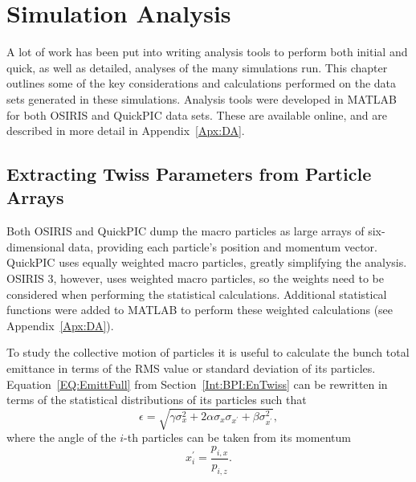 %
%

\chapter{Simulation Analysis}
\label{Ch:SimA}

A lot of work has been put into writing analysis tools to perform both initial and quick, as well as detailed, analyses of the many simulations run.
This chapter outlines some of the key considerations and calculations performed on the data sets generated in these simulations.
Analysis tools were developed in MATLAB for both OSIRIS and QuickPIC data sets.
These are available online, and are described in more detail in Appendix~\ref{Apx:DA}.

\section{Extracting Twiss Parameters from Particle Arrays}
\label{SimA:EnTwiss}

Both OSIRIS and QuickPIC dump the macro particles as large arrays of six-dimensional data, providing each particle's position and momentum vector.
QuickPIC uses equally weighted macro particles, greatly simplifying the analysis.
OSIRIS 3, however, uses weighted macro particles, so the weights need to be considered when performing the statistical calculations.
Additional statistical functions were added to MATLAB to perform these weighted calculations (see Appendix~\ref{Apx:DA}).

To study the collective motion of particles it is useful to calculate the bunch total emittance in terms of the RMS value or standard deviation of its particles.
Equation~\ref{EQ:EmittFull} from Section~\ref{Int:BPI:EnTwiss} can be rewritten in terms of the statistical distributions of its particles such that
\begin{equation}
    \epsilon = \sqrt{\gamma\sigma_{x}^{2} + 2\alpha\sigma_{x}\sigma_{x^{\prime}} + \beta\sigma_{x^{\prime}}^{2}}, \label{EQ:Emitt}
\end{equation}
where the angle of the $i$-th particles can be taken from its momentum
\begin{equation}
    x_{i}^{\prime} = \frac{p_{i,x}}{p_{i,z}}.
\end{equation}

